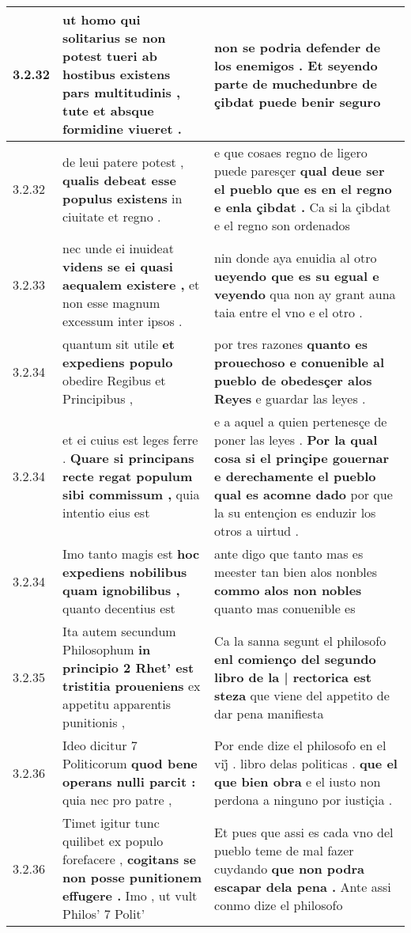 \begin{tabular}{|p{1cm}|p{6.5cm}|p{6.5cm}|}
3.2.32 & ut homo qui solitarius se non potest tueri \textbf{ ab hostibus existens pars multitudinis , } tute et absque formidine viueret . & non se podria defender de los enemigos . \textbf{ Et seyendo parte de muchedunbre de çibdat } puede benir seguro \\\hline
3.2.32 & de leui patere potest , \textbf{ qualis debeat esse populus existens } in ciuitate et regno . & e que cosaes regno de ligero puede paresçer \textbf{ qual deue ser el pueblo que es en el regno e enla çibdat . } Ca si la çibdat e el regno son ordenados \\\hline
3.2.33 & nec unde ei inuideat \textbf{ videns se ei quasi aequalem existere , } et non esse magnum excessum inter ipsos . & nin donde aya enuidia al otro \textbf{ ueyendo que es su egual e veyendo } qua non ay grant auna taia entre el vno e el otro . \\\hline
3.2.34 & quantum sit utile \textbf{ et expediens populo } obedire Regibus et Principibus , & por tres razones \textbf{ quanto es prouechoso e conuenible al pueblo de obedesçer alos Reyes } e guardar las leyes . \\\hline
3.2.34 & et ei cuius est leges ferre . \textbf{ Quare si principans recte regat populum sibi commissum , } quia intentio eius est & e a aquel a quien pertenesçe de poner las leyes . \textbf{ Por la qual cosa si el prinçipe gouernar e derechamente el pueblo qual es acomne dado } por que la su entençion es enduzir los otros a uirtud . \\\hline
3.2.34 & Imo tanto magis est \textbf{ hoc expediens nobilibus quam ignobilibus , } quanto decentius est & ante digo que tanto mas es meester tan bien alos nonbles \textbf{ commo alos non nobles } quanto mas conuenible es \\\hline
3.2.35 & Ita autem secundum Philosophum \textbf{ in principio 2 Rhet’ est tristitia proueniens } ex appetitu apparentis punitionis , & Ca la sanna segunt el philosofo \textbf{ enl comienço del segundo libro de la | rectorica est steza } que viene del appetito de dar pena manifiesta \\\hline
3.2.36 & Ideo dicitur 7 Politicorum \textbf{ quod bene operans nulli parcit : } quia nec pro patre , & Por ende dize el philosofo en el vij̊ . libro delas politicas . \textbf{ que el que bien obra } e el iusto non perdona a ninguno por iustiçia . \\\hline
3.2.36 & Timet igitur tunc quilibet ex populo forefacere , \textbf{ cogitans se non posse punitionem effugere . } Imo , ut vult Philos’ 7 Polit’ & Et pues que assi es cada vno del pueblo teme de mal fazer cuydando \textbf{ que non podra escapar dela pena . } Ante assi conmo dize el philosofo \\\hline

\end{tabular}
